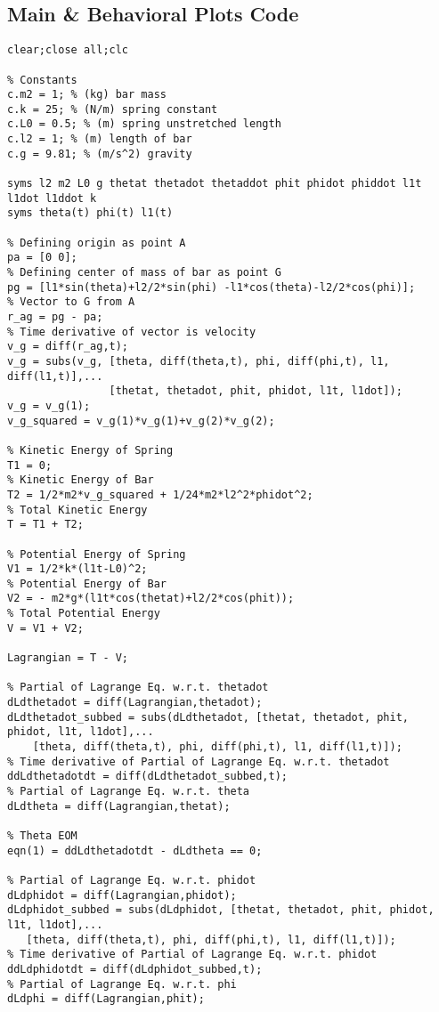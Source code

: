 \subsection{Main \& Behavioral Plots Code}
\begin{lstlisting}[frame=lines,style=Matlab-editor,basicstyle = \mlttfamily]
clear;close all;clc

% Constants
c.m2 = 1; % (kg) bar mass
c.k = 25; % (N/m) spring constant
c.L0 = 0.5; % (m) spring unstretched length
c.l2 = 1; % (m) length of bar
c.g = 9.81; % (m/s^2) gravity

syms l2 m2 L0 g thetat thetadot thetaddot phit phidot phiddot l1t l1dot l1ddot k
syms theta(t) phi(t) l1(t)

% Defining origin as point A
pa = [0 0];
% Defining center of mass of bar as point G
pg = [l1*sin(theta)+l2/2*sin(phi) -l1*cos(theta)-l2/2*cos(phi)];
% Vector to G from A
r_ag = pg - pa;
% Time derivative of vector is velocity
v_g = diff(r_ag,t);
v_g = subs(v_g, [theta, diff(theta,t), phi, diff(phi,t), l1, diff(l1,t)],...
                [thetat, thetadot, phit, phidot, l1t, l1dot]);
v_g = v_g(1);
v_g_squared = v_g(1)*v_g(1)+v_g(2)*v_g(2);

% Kinetic Energy of Spring
T1 = 0;
% Kinetic Energy of Bar
T2 = 1/2*m2*v_g_squared + 1/24*m2*l2^2*phidot^2;
% Total Kinetic Energy
T = T1 + T2;

% Potential Energy of Spring
V1 = 1/2*k*(l1t-L0)^2;
% Potential Energy of Bar
V2 = - m2*g*(l1t*cos(thetat)+l2/2*cos(phit));
% Total Potential Energy
V = V1 + V2;

Lagrangian = T - V;

% Partial of Lagrange Eq. w.r.t. thetadot
dLdthetadot = diff(Lagrangian,thetadot);
dLdthetadot_subbed = subs(dLdthetadot, [thetat, thetadot, phit, phidot, l1t, l1dot],...
    [theta, diff(theta,t), phi, diff(phi,t), l1, diff(l1,t)]);
% Time derivative of Partial of Lagrange Eq. w.r.t. thetadot
ddLdthetadotdt = diff(dLdthetadot_subbed,t);
% Partial of Lagrange Eq. w.r.t. theta
dLdtheta = diff(Lagrangian,thetat);

% Theta EOM
eqn(1) = ddLdthetadotdt - dLdtheta == 0;

% Partial of Lagrange Eq. w.r.t. phidot
dLdphidot = diff(Lagrangian,phidot);
dLdphidot_subbed = subs(dLdphidot, [thetat, thetadot, phit, phidot, l1t, l1dot],...
   [theta, diff(theta,t), phi, diff(phi,t), l1, diff(l1,t)]);
% Time derivative of Partial of Lagrange Eq. w.r.t. phidot
ddLdphidotdt = diff(dLdphidot_subbed,t);
% Partial of Lagrange Eq. w.r.t. phi
dLdphi = diff(Lagrangian,phit);


\end{lstlisting}

